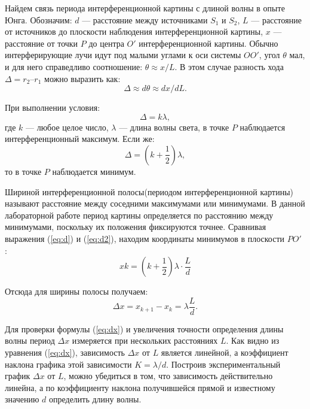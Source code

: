 \documentclass[12pt]{article}
\let\oldref\ref
\renewcommand{\ref}[1]{(\oldref{#1})}
\begin{document}
    Найдем связь периода интерференционной картины с длиной волны в опыте Юнга. Обозначим: $ d $ --- расстояние между источниками $ S_1 $ и $ S_2 $, $ L $ --- расстояние от источников до плоскости наблюдения интерференционной картины, $ x $ --- расстояние от точки $ P $ до центра $ O' $ интерференционной картины. Обычно интерферирующие лучи идут под малыми углами к оси системы $ OO' $, угол $ \theta $ мал, и для него справедливо соотношение: $ \theta \approx x / L $. В этом случае разность хода $ \Delta = r_2 – r_1 $ можно выразить как:
    \begin{equation}
        \label{eq:d}
        \Delta \approx d\theta \approx dx /dL.
    \end{equation}

    При выполнении условия:
    \begin{equation}
        \label{eq:con}
        \Delta = k\lambda,
    \end{equation}
    где $ k $ --- любое целое число, $ \lambda $ --- длина волны света, в точке $ P $ наблюдается интерференционный максимум. Если же:
    \begin{equation}
        \label{eq:d2}
        \Delta = (k + \frac{1}{2})\lambda,
    \end{equation}
    то в точке $ P $ наблюдается минимум.

    Шириной интерференционной полосы(периодом интерференционной картины) называют расстояние между соседними максимумами или минимумами. В данной лабораторной работе период картины определяется по расстоянию между минимумами, поскольку их положения фиксируются точнее. Сравнивая выражения \ref{eq:d} и \ref{eq:d2}, находим координаты минимумов в плоскости $ PO' $ :
    \begin{equation}
        \label{eq:xk}
        xk = (k + \frac{1}{2})\lambda \cdot \frac{L}{d}
    \end{equation}

    Отсюда для ширины полосы получаем:
    \begin{equation}
        \label{eq:dx}
        \Delta x = x_{k+1} - x_k = \lambda \frac{L}{d}.
    \end{equation}

    Для проверки формулы \ref{eq:dx} и увеличения точности определения длины волны период $ \Delta x $ измеряется при нескольких расстояниях $ L $. Как видно из уравнения \ref{eq:dx}, зависимость $ \Delta x $ от $ L $ является линейной, а коэффициент наклона графика этой зависимости $ K = \lambda / d  $. Построив экспериментальный график $ \Delta x $ от $ L $, можно убедиться в том, что зависимость действительно линейна, а по коэффициенту наклона получившейся прямой и известному значению $ d $ определить длину волны.
\end{document}
